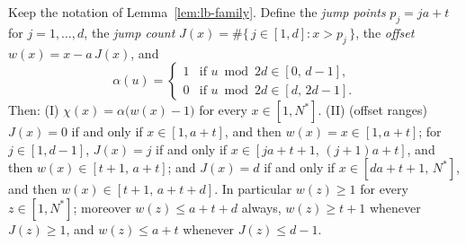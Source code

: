 \begin{lemma}\label{lem:lb-normalform}
Keep the notation of Lemma~\ref{lem:lb-family}. Define the \emph{jump points}
$p_j = ja + t$ for $j = 1, \dots, d$, the \emph{jump count}
$J(x) = \#\{\, j \in [1, d] : x > p_j \,\}$, the \emph{offset}
$w(x) = x - a\,J(x)$, and
\[
  \alpha(u) =
  \begin{cases}
    1 & \text{if } u \bmod 2d \in [0,\, d-1],\\
    0 & \text{if } u \bmod 2d \in [d,\, 2d-1].
  \end{cases}
\]
Then:
(I) $\chi(x) = \alpha\bigl(w(x) - 1\bigr)$ for every $x \in [1, N^{*}]$.
(II) (offset ranges) $J(x) = 0$ if and only if $x \in [1, a+t]$, and then
$w(x) = x \in [1, a+t]$; for $j \in [1, d-1]$, $J(x) = j$ if and only if
$x \in [ja+t+1,\, (j+1)a+t]$, and then $w(x) \in [t+1,\, a+t]$; and $J(x) = d$ if
and only if $x \in [da+t+1,\, N^{*}]$, and then $w(x) \in [t+1,\, a+t+d]$. In
particular $w(z) \ge 1$ for every $z \in [1, N^{*}]$; moreover $w(z) \le a+t+d$
always, $w(z) \ge t+1$ whenever $J(z) \ge 1$, and $w(z) \le a+t$ whenever
$J(z) \le d-1$.
\end{lemma}

